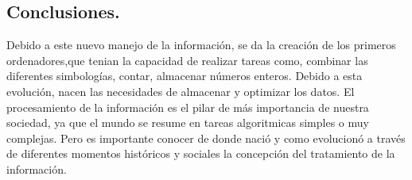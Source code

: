 \documentclass[letterpaper, 12 pt, conference]{ieeeconf}  %
\begin{document}
\subsection{Conclusiones.}
Debido a este nuevo manejo de la información, se da la creación de los primeros ordenadores,que tenian la capacidad de realizar tareas como, combinar las diferentes simbologías,  contar, almacenar números enteros. Debido a esta evolución, nacen las necesidades de almacenar y optimizar los datos. 
El procesamiento de la información es el pilar de más importancia de nuestra sociedad, ya que el mundo se resume en tareas algoritmicas simples o muy complejas. Pero es importante conocer de donde nació y como evolucionó a través de diferentes momentos históricos y sociales la concepción del tratamiento de la información.



    






\addtolength{\textheight}{-12cm}   %












\end{document}
